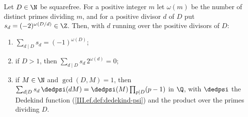 Let $D\in\N$ be squarefree. For a positive integer $m$ let $\omega(m)$ be the number of distinct primes dividing $m$, and for a positive divisor
$d$ of $D$ put $s_d=(-2)^{\omega(D/d)}\in\Z$. Then, with $d$ running over the positive divisors of $D$:
\begin{enumerate}[label=(\alph*)]
\item $\sum_{d\mid D}s_d=(-1)^{\omega(D)}$;
\item if $D>1$, then $\sum_{d\mid D}s_d\,2^{\omega(d)}=0$;
\item if $M\in\N$ and $\gcd(D,M)=1$, then $\sum_{d\mid D}s_d\,\dedpsi(dM)=\dedpsi(M)\prod_{p\mid D}(p-1)$ in $\Q$, with $\dedpsi$ the Dedekind
  function (\cref{III.ef.def:dedekind-psi}) and the product over the primes dividing $D$.
\end{enumerate}
